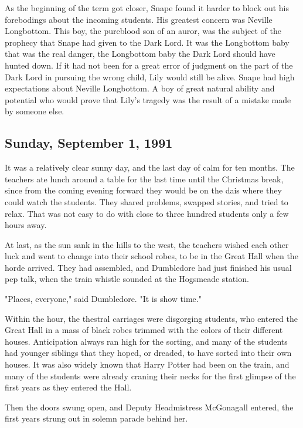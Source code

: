 As the beginning of the term got closer, Snape found it harder to block out his forebodings about the incoming students. His greatest concern was Neville Longbottom. This boy, the pureblood son of an auror, was the subject of the prophecy that Snape had given to the Dark Lord. It was the Longbottom baby that was the real danger, the Longbottom baby the Dark Lord should have hunted down. If it had not been for a great error of judgment on the part of the Dark Lord in pursuing the wrong child, Lily would still be alive. Snape had high expectations about Neville Longbottom. A boy of great natural ability and potential who would prove that Lily's tragedy was the result of a mistake made by{\el} someone else.

\subsection{Sunday, September 1, 1991}

It was a relatively clear sunny day, and the last day of calm for ten months. The teachers ate lunch around a table for the last time until the Christmas break, since from the coming evening forward they would be on the dais where they could watch the students. They shared problems, swapped stories, and tried to relax. That was not easy to do with close to three hundred students only a few hours away.

At last, as the sun sank in the hills to the west, the teachers wished each other luck and went to change into their school robes, to be in the Great Hall when the horde arrived. They had assembled, and Dumbledore had just finished his usual pep talk, when the train whistle sounded at the Hogsmeade station.

"Places, everyone," said Dumbledore. "It is show time."

Within the hour, the thestral carriages were disgorging students, who entered the Great Hall in a mass of black robes trimmed with the colors of their different houses. Anticipation always ran high for the sorting, and many of the students had younger siblings that they hoped, or dreaded, to have sorted into their own houses. It was also widely known that Harry Potter had been on the train, and many of the students were already craning their necks for the first glimpse of the first years as they entered the Hall.

Then the doors swung open, and Deputy Headmistress McGonagall entered, the first years strung out in solemn parade behind her.

